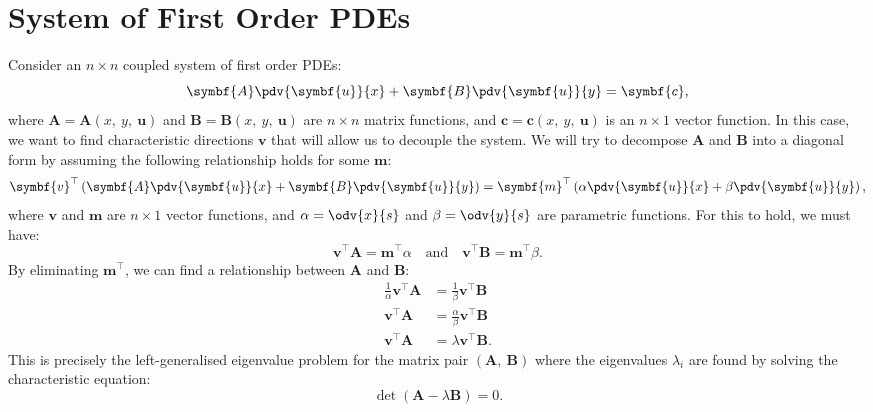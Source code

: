 \documentclass{article}
\theoremstyle{definition}
\begin{document}
\section{System of First Order PDEs}
Consider an \(n \times n\) coupled system of first order PDEs:
\begin{equation*}
    \symbf{A} \pdv{\symbf{u}}{x} + \symbf{B} \pdv{\symbf{u}}{y} = \symbf{c},
\end{equation*}
where \(\symbf{A} = \symbf{A}\left( x,\: y,\: \symbf{u} \right)\) and
\(\symbf{B} = \symbf{B}\left( x,\: y,\: \symbf{u} \right)\) are
\(n \times n\) matrix functions, and
\(\symbf{c} = \symbf{c}\left( x,\: y,\: \symbf{u} \right)\) is an
\(n \times 1\) vector function.
In this case, we want to find characteristic directions \(\symbf{v}\)
that will allow us to decouple the system. We will try to decompose
\(\symbf{A}\) and \(\symbf{B}\) into a diagonal form by assuming the
following relationship holds for some \(\symbf{m}\):
\begin{equation*}
    \symbf{v}^\top \left( \symbf{A} \pdv{\symbf{u}}{x} + \symbf{B} \pdv{\symbf{u}}{y} \right) = \symbf{m}^\top \left( \alpha \pdv{\symbf{u}}{x} + \beta \pdv{\symbf{u}}{y} \right),
\end{equation*}
where \(\symbf{v}\) and \(\symbf{m}\) are \(n \times 1\) vector
functions, and \(\alpha = \odv{x}{s}\) and \(\beta = \odv{y}{s}\) are
parametric functions. For this to hold, we must have:
\begin{equation*}
    \symbf{v}^\top \symbf{A} = \symbf{m}^\top \alpha \quad \text{and} \quad \symbf{v}^\top \symbf{B} = \symbf{m}^\top \beta.
\end{equation*}
By eliminating \(\symbf{m}^\top\), we can find a relationship between
\(\symbf{A}\) and \(\symbf{B}\):
\begin{align*}
    \frac{1}{\alpha} \symbf{v}^\top \symbf{A} & = \frac{1}{\beta} \symbf{v}^\top \symbf{B}      \\
    \symbf{v}^\top \symbf{A}                  & = \frac{\alpha}{\beta} \symbf{v}^\top \symbf{B} \\
    \symbf{v}^\top \symbf{A}                  & = \lambda \symbf{v}^\top \symbf{B}.
\end{align*}
This is precisely the left-generalised eigenvalue problem for the matrix
pair \(\left( \symbf{A},\: \symbf{B} \right)\) where the eigenvalues
\(\lambda_i\) are found by solving the characteristic equation:
\begin{equation*}
    \det{\left( \symbf{A} - \lambda \symbf{B} \right)} = 0.
\end{equation*}
\end{document}
